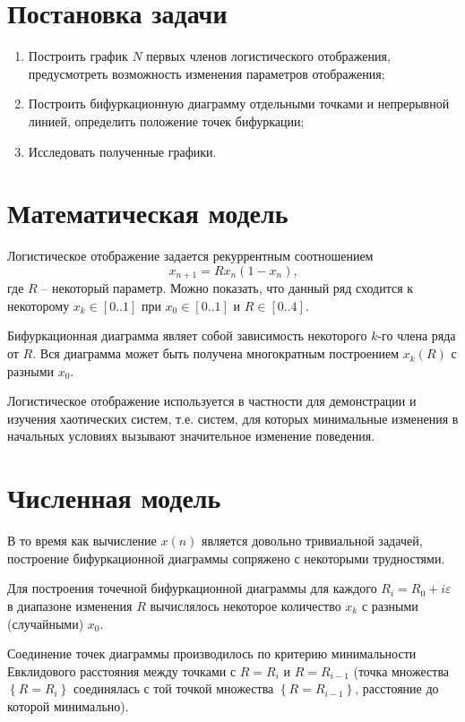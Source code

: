 \documentclass[12pt,a4paper]{article}
\begin{document}
\section{Постановка задачи}

\begin{enumerate}
\item Построить график $N$ первых членов логистического отображения, предусмотреть возможность изменения параметров отображения;
\item Построить бифуркационную диаграмму отдельными точками и непрерывной линией, определить положение точек бифуркации;
\item Исследовать полученные графики.
\end{enumerate}

\section{Математическая модель}

Логистическое отображение задается рекуррентным соотношением
\begin{equation}
x_{n+1} = R x_n \left(1 - x_n\right) \textrm{,}
\end{equation}
где $R$ -- некоторый параметр. Можно показать, что данный ряд сходится к некоторому $x_k \in \left[0..1\right]$ при $x_0 \in \left[0..1\right]$ и $R \in \left[0..4\right]$.

Бифуркационная диаграмма являет собой зависимость некоторого $k$-го члена ряда от $R$. Вся диаграмма может быть получена многократным построением $x_k(R)$ с разными $x_0$.

Логистическое отображение используется в частности для демонстрации и изучения хаотических систем, т.е. систем, для которых минимальные изменения в начальных условиях вызывают значительное изменение поведения.

\section{Численная модель}

В то время как вычисление $x(n)$ является довольно тривиальной задачей, построение бифуркационной диаграммы сопряжено с некоторыми трудностями.

Для построения точечной бифуркационной диаграммы для каждого $R_i = R_0 + i\varepsilon$ в диапазоне изменения $R$ вычислялось некоторое количество $x_k$ с разными (случайными) $x_0$.

Соединение точек диаграммы производилось по критерию минимальности Евклидового расстояния между точками с $R = R_{i}$ и $R = R_{i - 1}$ (точка множества $\left\{R = R_{i}\right\}$ соединялась с той точкой множества $\left\{R = R_{i - 1}\right\}$, расстояние до которой минимально).
\end{document}
